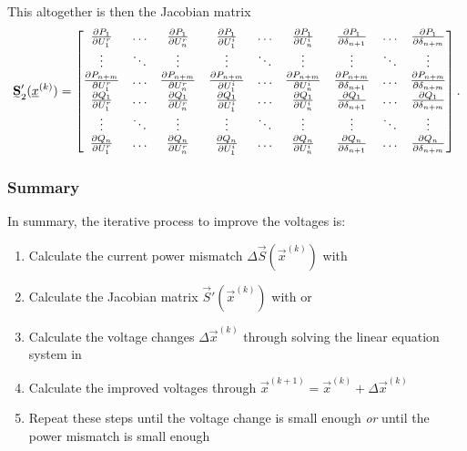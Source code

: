 This altogether is then the Jacobian matrix
\begin{equation}
	\mat S_2' (\vec x^{(k)}) = 
	\begin{bmatrix}
		\frac{\partial P_1}{\partial U_1^r}	& \hdots & \frac{\partial P_1}{\partial U_n^r} & \frac{\partial P_1}{\partial U_1^i} & \hdots & \frac{\partial P_1}{\partial U_n^i}	& \frac{\partial P_1}{\partial \delta_{n + 1}} & \hdots & \frac{\partial P_1}{\partial \delta_{n + m}} \\
		\vdots & \ddots	& \vdots & \vdots & \ddots & \vdots & \vdots & \ddots & \vdots \\
		\frac{\partial P_{n + m}}{\partial U_1^r} & \hdots & \frac{\partial P_{n + m}}{\partial U_n^r} & \frac{\partial P_{n + m}}{\partial U_1^i} & \hdots & \frac{\partial P_{n + m}}{\partial U_n^i} & \frac{\partial P_{n + m}}{\partial \delta_{n + 1}} & \hdots & \frac{\partial P_{n + m}}{\partial \delta_{n + m}} \\
		\frac{\partial Q_1}{\partial U_1^r}	& \hdots & \frac{\partial Q_1}{\partial U_n^r} & \frac{\partial Q_1}{\partial U_1^i} & \hdots & \frac{\partial Q_1}{\partial U_n^i}	& \frac{\partial Q_1}{\partial \delta_{n + 1}} & \hdots & \frac{\partial Q_1}{\partial \delta_{n + m}} \\
		\vdots & \ddots	& \vdots & \vdots & \ddots & \vdots & \vdots & \ddots & \vdots \\
		\frac{\partial Q_n}{\partial U_1^r} & \hdots & \frac{\partial Q_n}{\partial U_n^r} & \frac{\partial Q_n}{\partial U_1^i} & \hdots & \frac{\partial Q_n}{\partial U_n^i} & \frac{\partial Q_n}{\partial \delta_{n + 1}} & \hdots & \frac{\partial Q_n}{\partial \delta_{n + m}} \\
	\end{bmatrix}.
	\label{eq:power_jacobian_newton_rapshon_2}
\end{equation}

\subsubsection{Summary}
In summary, the iterative process to improve the voltages is:
\begin{enumerate}
	\item Calculate the current power mismatch $\Delta \vec S (\vec x^{(k)})$ with 
	\item Calculate the Jacobian matrix $\vec S' (\vec x^{(k)})$ with  or 
	\item Calculate the voltage changes $\Delta \vec x^{(k)}$ through solving the linear equation system in 
	\item Calculate the improved voltages through $\vec x^{(k+1)} = \vec x^{(k)} + \Delta \vec x^{(k)}$
	\item Repeat these steps until the voltage change is small enough \emph{or} until the power mismatch is small enough
\end{enumerate}

